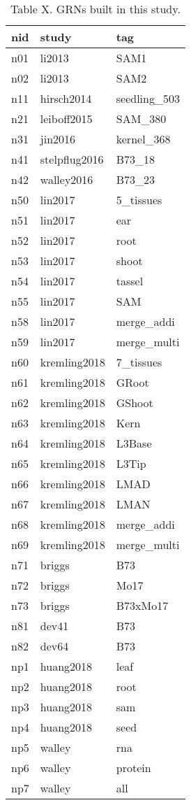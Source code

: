 \documentclass[11pt,]{article}
\begin{document}
\begin{longtable}[t]{>{}lll}
\caption{\label{tab:unnamed-chunk-1}Table X. GRNs built in this study.}\\
\toprule
nid & study & tag\\
\midrule
n01 & li2013 & SAM1\\
n02 & li2013 & SAM2\\
n11 & hirsch2014 & seedling\_503\\
n21 & leiboff2015 & SAM\_380\\
n31 & jin2016 & kernel\_368\\
\addlinespace
n41 & stelpflug2016 & B73\_18\\
n42 & walley2016 & B73\_23\\
n50 & lin2017 & 5\_tissues\\
n51 & lin2017 & ear\\
n52 & lin2017 & root\\
\addlinespace
n53 & lin2017 & shoot\\
n54 & lin2017 & tassel\\
n55 & lin2017 & SAM\\
n58 & lin2017 & merge\_addi\\
n59 & lin2017 & merge\_multi\\
\addlinespace
n60 & kremling2018 & 7\_tissues\\
n61 & kremling2018 & GRoot\\
n62 & kremling2018 & GShoot\\
n63 & kremling2018 & Kern\\
n64 & kremling2018 & L3Base\\
\addlinespace
n65 & kremling2018 & L3Tip\\
n66 & kremling2018 & LMAD\\
n67 & kremling2018 & LMAN\\
n68 & kremling2018 & merge\_addi\\
n69 & kremling2018 & merge\_multi\\
\addlinespace
n71 & briggs & B73\\
n72 & briggs & Mo17\\
n73 & briggs & B73xMo17\\
n81 & dev41 & B73\\
n82 & dev64 & B73\\
\addlinespace
np1 & huang2018 & leaf\\
np2 & huang2018 & root\\
np3 & huang2018 & sam\\
np4 & huang2018 & seed\\
np5 & walley & rna\\
\addlinespace
np6 & walley & protein\\
np7 & walley & all\\
\bottomrule
\end{longtable}
\end{document}
